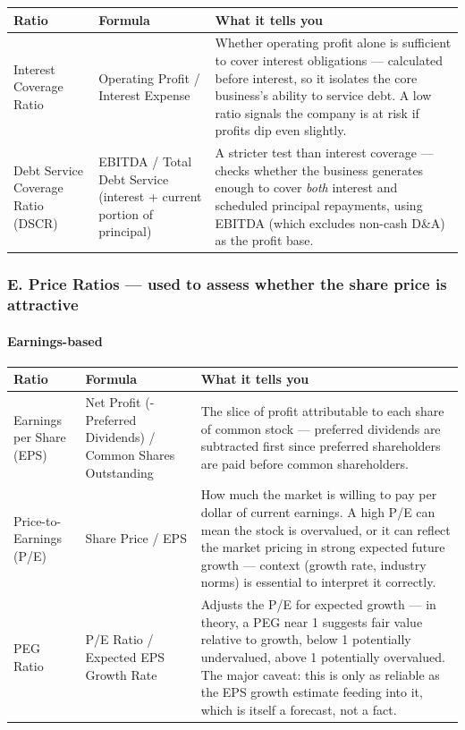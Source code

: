 \documentclass[12pt,openany]{book}
\begin{document}
\begingroup
\small
\setlength{\tabcolsep}{4pt}
\begin{center}\begin{tabular}{|L{0.22\textwidth}|L{0.24\textwidth}|L{0.42\textwidth}|}
\hline
\textbf{Ratio} & \textbf{Formula} & \textbf{What it tells you} \\
\hline
Interest Coverage Ratio & Operating Profit / Interest Expense & Whether operating profit alone is sufficient to cover interest obligations --- calculated before interest, so it isolates the core business's ability to service debt. A low ratio signals the company is at risk if profits dip even slightly. \\
\hline
Debt Service Coverage Ratio (DSCR) & EBITDA / Total Debt Service (interest + current portion of principal) & A stricter test than interest coverage --- checks whether the business generates enough to cover \emph{both} interest and scheduled principal repayments, using EBITDA (which excludes non-cash D\&A) as the profit base. \\
\hline
\end{tabular}\end{center}
\endgroup

\subsubsection{E. Price Ratios --- used to assess whether the share price is attractive}

\paragraph{Earnings-based} 

\begingroup
\small
\setlength{\tabcolsep}{4pt}
\begin{center}\begin{tabular}{|L{0.22\textwidth}|L{0.24\textwidth}|L{0.42\textwidth}|}
\hline
\textbf{Ratio} & \textbf{Formula} & \textbf{What it tells you} \\
\hline
Earnings per Share (EPS) & Net Profit (- Preferred Dividends) / Common Shares Outstanding & The slice of profit attributable to each share of common stock --- preferred dividends are subtracted first since preferred shareholders are paid before common shareholders. \\
\hline
Price-to-Earnings (P/E) & Share Price / EPS & How much the market is willing to pay per dollar of current earnings. A high P/E can mean the stock is overvalued, or it can reflect the market pricing in strong expected future growth --- context (growth rate, industry norms) is essential to interpret it correctly. \\
\hline
PEG Ratio & P/E Ratio / Expected EPS Growth Rate & Adjusts the P/E for expected growth --- in theory, a PEG near 1 suggests fair value relative to growth, below 1 potentially undervalued, above 1 potentially overvalued. The major caveat: this is only as reliable as the EPS growth estimate feeding into it, which is itself a forecast, not a fact. \\
\hline
\end{tabular}\end{center}
\endgroup
\end{document}
